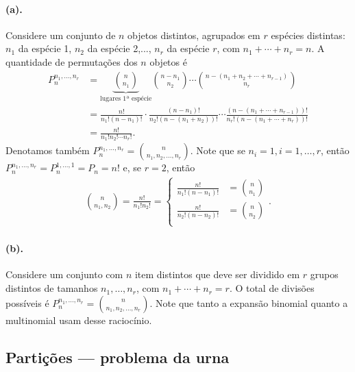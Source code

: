 \documentclass[../Notas.tex]{subfiles}
\begin{document}
\paragraph{(a).} Considere um conjunto de $n$ objetos distintos, agrupados em $r$ espécies distintas: $n_1$ da espécie 1, $n_2$ da espécie 2,..., $n_r$ da espécie $r$, com $n_1 + \cdots + n_r = n$. A quantidade de permutações dos $n$ objetos é
\begin{align*}
    P_{n}^{n_1, \dots, n_r} &= \underbrace{\binom{n}{n_1}}_{\text{lugares 1ª espécie}}\binom{n-n_1}{n_2}\cdots\binom{n - (n_1 + n_2 + \cdots + n_{r-1})}{n_r} \\
    &= \frac{n!}{n_1!(n-n_1)!}\cdot\frac{(n-n_1)!}{n_2!(n-(n_1+n_2))!}\cdots\frac{(n-(n_1+\cdots+n_{r-1}))!}{n_r!(n-(n_1+\cdots+n_r))!} \\
    &= \frac{n!}{n_1!n_2!\cdots n_r!}.
\end{align*}
Denotamos também $\displaystyle{ P_n^{n_1, \dots, n_r} = \binom{n}{n_1, n_2, \dots, n_r} }$. Note que se $n_i = 1, i=1,\dots,r$, então $P_n^{n_1, \dots, n_r} = P_n^{1,\dots, 1} = P_n = n!$ e, se $r=2$, então
\begin{align*}
    \binom{n}{n_1, n_2} = \frac{n!}{n_1!n_2!} = \begin{cases}
        \frac{n!}{n_1!(n-n_1)!} &= \binom{n}{n_1} \\
        \frac{n!}{n_2!(n-n_2)!} &= \binom{n}{n_2} \\
    \end{cases}.
\end{align*}

\paragraph{(b).} Considere um conjunto com $n$ item distintos que deve ser dividido em $r$ grupos distintos de tamanhos $n_1, \dots, n_r$, com $n_1 + \cdots + n_r = r$. O total de divisões possíveis é $\displaystyle{ P_n^{n_1, \dots, n_r} = \binom{n}{n_1, n_2, \dots, n_r} }$. Note que tanto a expansão binomial quanto a multinomial usam desse raciocínio.

\subsection{Partições --- problema da urna}
\end{document}
